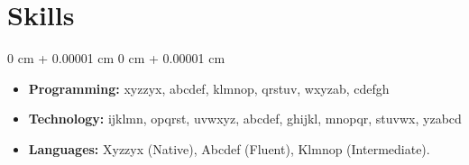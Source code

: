 \documentclass[11pt, letterpaper]{article}
\newenvironment{highlights}{
    \begin{itemize}[
        topsep=0.08 cm,
        parsep=0.08 cm,
        partopsep=0pt,
        itemsep=0pt,
        leftmargin=0.2 cm + 17pt
    ]
}
{
    \end{itemize}
}
\newenvironment{onecolentry}{
    \begin{adjustwidth}{
        0 cm + 0.00001 cm
    }{
        0 cm + 0.00001 cm
    }
}{
    \end{adjustwidth}
}
\begin{document}
\section{Skills}
\vspace{0.08 cm}
\begin{onecolentry}
    \begin{highlights}
        \item \textbf{Programming:} xyzzyx, abcdef, klmnop, qrstuv, wxyzab, cdefgh
        \item \textbf{Technology:} ijklmn, opqrst, uvwxyz, abcdef, ghijkl, mnopqr, stuvwx, yzabcd
        \item \textbf{Languages:} Xyzzyx (Native), Abcdef (Fluent), Klmnop (Intermediate).
    \end{highlights}
\end{onecolentry}
\end{document}
